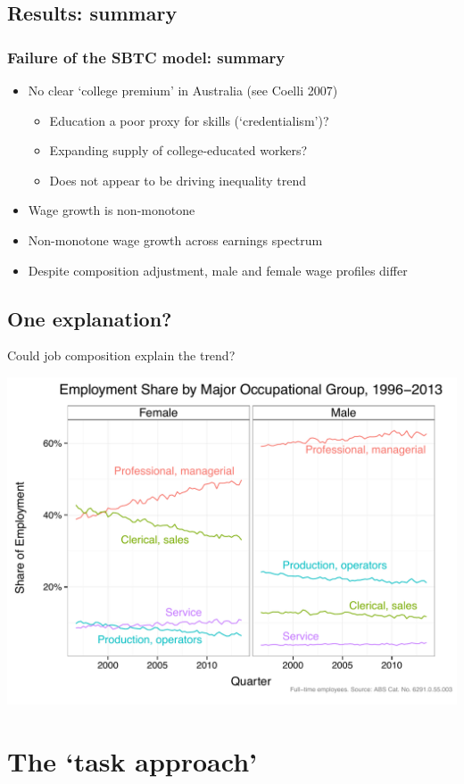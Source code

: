 \documentclass[red]{beamer}
\newcommand{\vitem}{\vfill\item}
\begin{document}
\subsection{Results: summary}
\begin{frame}
  \frametitle{Failure of the SBTC model: summary}
  \begin{itemize}
  \vitem No clear `college premium' in Australia (see Coelli 2007)
  \begin{itemize}
  \vitem Education a poor proxy for skills (`credentialism')?
  \vitem Expanding supply of college-educated workers?
  \vitem Does not appear to be driving inequality trend
  \end{itemize}
  \vitem Wage growth is non-monotone
  \vitem Non-monotone wage growth across earnings spectrum
  \vitem Despite composition adjustment, male and female wage profiles differ
  \end{itemize}
\end{frame}

\subsection{One explanation?}
\begin{frame}{Could job composition explain the trend?}
  \begin{center}
    \includegraphics[width=\textwidth]{slides_fig/occ_share_sex.pdf}
  \end{center}
\end{frame}

\section{The `task approach'}
\end{document}
